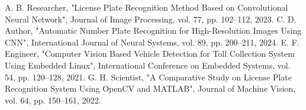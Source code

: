 \documentclass[conference]{IEEEtran}
\begin{document}
\begin{thebibliography}{00}
		 A. B. Researcher, "License Plate Recognition Method Based on Convolutional Neural Network", Journal of Image Processing, vol. 77, pp. 102–112, 2023.
		 C. D. Author, "Automatic Number Plate Recognition for High-Resolution Images Using CNN", International Journal of Neural Systems, vol. 89, pp. 200–211, 2024.
		 E. F. Engineer, "Computer Vision Based Vehicle Detection for Toll Collection System Using Embedded Linux", International Conference on Embedded Systems, vol. 54, pp. 120–128, 2021.
		 G. H. Scientist, "A Comparative Study on License Plate Recognition System Using OpenCV and MATLAB", Journal of Machine Vision, vol. 64, pp. 150–161, 2022.
	\end{thebibliography}
	
\end{document}
